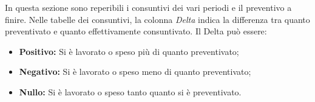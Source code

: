 In questa sezione sono reperibili i consuntivi dei vari periodi e il preventivo a finire.\newline
Nelle tabelle dei consuntivi, la colonna \emph{Delta} indica la differenza tra quanto preventivato e quanto effettivamente consuntivato. Il Delta può essere:
\begin{itemize}
	\item \textbf{Positivo: }Si è lavorato o speso più di quanto preventivato;
	\item \textbf{Negativo: }Si è lavorato o speso meno di quanto preventivato;
	\item \textbf{Nullo: }Si è lavorato o speso tanto quanto si è preventivato.
\end{itemize}